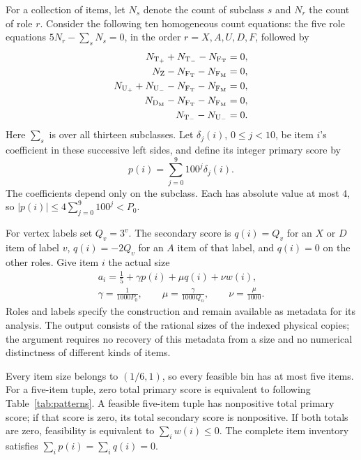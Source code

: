 For a collection of items, let $N_s$ denote the count of subclass $s$
and $N_r$ the count of role $r$. Consider the following ten homogeneous
count equations: the five role equations
$5N_r-\sum_sN_s=0$, in the order $r=X,A,U,D,F$, followed by
\begin{equation}\label{eq:pattern-count-equations}
 \begin{aligned}
  N_{\mathrm{T}_{+}}+N_{\mathrm{T}_{-}}-N_{\mathrm{F}_{\mathrm T}}&=0,\\
  N_{\mathrm{Z}}-N_{\mathrm{F}_{\mathrm T}}-N_{\mathrm{F}_{\mathrm M}}&=0,\\
  N_{\mathrm{U}_{+}}+N_{\mathrm{U}_{-}}-N_{\mathrm{F}_{\mathrm T}}-N_{\mathrm{F}_{\mathrm M}}&=0,\\
  N_{\mathrm{D}_{\mathrm M}}-N_{\mathrm{F}_{\mathrm T}}-N_{\mathrm{F}_{\mathrm M}}&=0,\\
  N_{\mathrm{T}_{-}}-N_{\mathrm{U}_{-}}&=0.
 \end{aligned}
\end{equation}
Here $\sum_s$ is over all thirteen subclasses. Let $\delta_j(i)$,
$0\le j<10$, be item $i$'s coefficient in these successive left sides,
and define its integer primary score by
\[
 p(i)=\sum_{j=0}^9 100^j\delta_j(i).
\]
The coefficients depend only on the subclass. Each has absolute value
at most $4$, so
$|p(i)|\le4\sum_{j=0}^9 100^j<P_0$.

For vertex labels set $Q_v=3^v$. The secondary score is $q(i)=Q_v$ for
an $X$ or $D$ item of label $v$, $q(i)=-2Q_v$ for an $A$ item of that
label, and $q(i)=0$ on the other roles. Give item $i$ the actual size
\begin{equation}\label{eq:item-size}
 \begin{gathered}
  a_i=\frac15+\gamma p(i)+\mu q(i)+\nu w(i),\\
  \gamma=\frac1{1000P_0},\qquad
  \mu=\frac{\gamma}{1000Q_n},\qquad
  \nu=\frac{\mu}{1000}.
 \end{gathered}
\end{equation}
Roles and labels specify the construction and remain available as
metadata for its analysis. The output consists of the rational sizes of
the indexed physical copies; the argument requires no recovery of this
metadata from a size and no numerical distinctness of different kinds
of items.

\begin{lemma}\label{lem:encoding}
Every item size belongs to $(1/6,1)$, so every feasible bin has at most
five items. For a five-item tuple, zero total primary score is equivalent
to following Table~\ref{tab:patterns}. A feasible five-item tuple has
nonpositive total primary score; if that score is zero, its total
secondary score is nonpositive. If both totals are zero, feasibility is
equivalent to $\sum_iw(i)\le0$. The complete item inventory satisfies
$\sum_i p(i)=\sum_iq(i)=0$.
\end{lemma}

